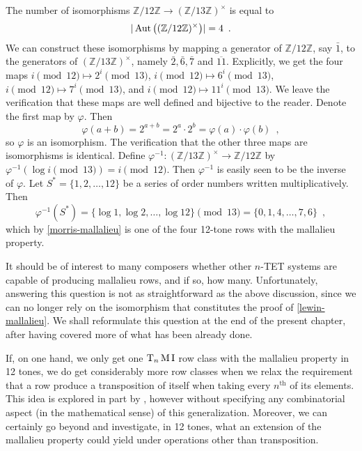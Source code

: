 \begin{example}
	\cite[8]{Lewin1976a}
	\cite[9]{Babbitt1976}
	The number of isomorphisms
	$\mathbb{Z} / 12 \mathbb{Z} \to (\mathbb{Z} / 13 \mathbb{Z})^\times$ is equal to
	\begin{equation}
		|\operatorname{Aut}\big((\mathbb{Z} / 12 \mathbb{Z})^\times\big)| = 4 \enspace.
	\end{equation}
	We can construct these isomorphisms by mapping a generator of
	$\mathbb{Z} / 12 \mathbb{Z}$, say $\bar{1}$, to the generators of
	$(\mathbb{Z} / 13 \mathbb{Z})^\times$, namely $\bar{2}, \bar{6}, \bar{7}$ and
	$\overline{11}$. Explicitly, we get the four maps $i \pmod{12} \mapsto 2^i \pmod{13}$,
	$i \pmod{12} \mapsto 6^i \pmod{13}$, $i \pmod{12} \mapsto 7^i \pmod{13}$, and
	$i \pmod{12} \mapsto 11^i \pmod{13}$. We leave the verification that these maps are
	well defined and bijective to the reader. Denote the first map by $\varphi$. Then
	\begin{equation}
		\varphi(a + b) = 2^{a + b} = 2^a \cdot 2^b = \varphi(a) \cdot \varphi(b) \enspace,
	\end{equation}
	so $\varphi$ is an isomorphism. The verification that the other three maps are
	isomorphisms is identical. Define
	$\varphi^{-1} : (\mathbb{Z} / 13 \mathbb{Z})^\times \to \mathbb{Z} / 12 \mathbb{Z}$ by
	$\varphi^{-1}(\log i \pmod{13}) = i \pmod{12}$. Then $\varphi^{-1}$ is easily seen to
	be the inverse of $\varphi$. Let $S^* = \{ 1, 2, \dots, 12 \}$ be a series of order
	numbers written multiplicatively. Then
	\begin{equation}
		\varphi^{-1}(S^*) = \{ \log 1, \log 2, \dots, \log 12 \} \pmod{13} =
		\{ 0, 1, 4, \dots, 7, 6 \} \enspace,
	\end{equation}
	which by \ref{morris-mallalieu} is one of the four 12-tone rows with the mallalieu
	property.
\end{example}

It should be of interest to many composers whether other $n$-TET systems are capable
of producing mallalieu rows, and if so, how many. Unfortunately, answering this question
is not as straightforward as the above discussion, since we can no longer rely on
the isomorphism that constitutes the proof of \ref{lewin-mallalieu}. We shall reformulate
this question at the end of the present chapter, after having covered more of what has
been already done.

If, on one hand, we only get one $\operatorname{T}_n\operatorname{M}\operatorname{I}$ row class with the mallalieu property in
12 tones, we do get considerably more row classes when we relax the requirement that a row
produce a transposition of itself when taking every $n^\text{th}$ of its elements.
This idea is explored in part by \cite{Mead1989}, however without specifying
any combinatorial aspect (in the mathematical sense) of this generalization. Moreover,
we can certainly go beyond \cite{Mead1989} and investigate, in 12 tones, what an
extension of the mallalieu property could yield under operations other than transposition.
